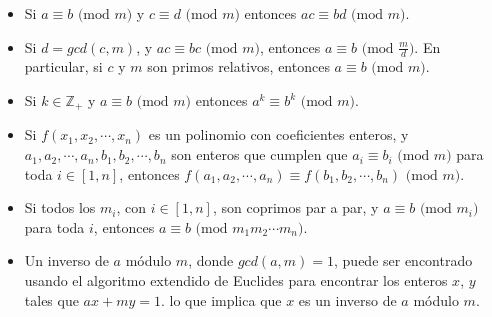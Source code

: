 \begin{itemize}
{    }
    \item{
	    Si $a \equiv b \text{ (mod $m$)}$ y $c \equiv d \text{ (mod $m$)}$ entonces 
	    $ac \equiv bd \text{ (mod $m$)}$.	
    }
    \item{
	    Si $d = gcd(c, m)$, y $ac \equiv bc \text{ (mod $m$)}$, entonces 
	    $a \equiv b \text{ (mod $\frac{m}{d}$)}$. En particular, si $c$ y $m$ son primos relativos, 
	    entonces $a \equiv b \text{ (mod $m$)}$.	
    }
    \item{
	    Si $k \in \mathbb{Z}_{+}$ y $a \equiv b \text{ (mod $m$)}$ entonces $a^k \equiv b^k \text{ (mod $m$)}$.	
    }
    \item{
	    Si $f(x_1, x_2, \cdots, x_n)$ es un polinomio con coeficientes enteros, y 
	    $a_1, a_2, \cdots, a_n, b_1, b_2, \cdots, b_n$ son enteros que cumplen que $a_i \equiv b_i \text{ (mod $m$)}$
	    para toda $i \in [1, n]$, entonces $f(a_1, a_2, \cdots, a_n) \equiv f(b_1, b_2, \cdots, b_n) \text{ (mod $m$)}$.	 	
    }
    \item{
        Si todos los $m_i$, con $i \in [1, n]$, son coprimos par a par, y $a \equiv b \text{ (mod $m_i$)}$ 
        para toda $i$, entonces $a \equiv b \text{ (mod $m_1 m_2 \cdots m_n$)}$. 
    }
    \item{
		Un inverso de $a$ m\'odulo $m$, donde $gcd(a, m) = 1$, puede ser encontrado usando el algoritmo extendido 
		de Euclides para encontrar los enteros $x$, $y$ tales que $ax + my = 1$. lo que implica que $x$ es un inverso 
		de $a$ m\'odulo $m$.
    }
\end{itemize}
